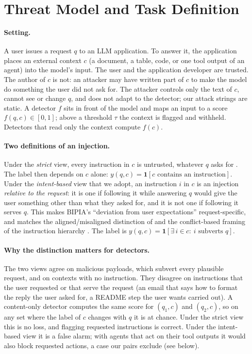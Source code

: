 \section{Threat Model and Task Definition}
\label{sec:task}

\paragraph{Setting.}
A user issues a request $q$ to an LLM application. To answer it, the application places an external context $c$ (a
document, a table, code, or one tool output of an agent) into the model's input. The user and the application
developer are trusted. The author of $c$ is not: an attacker may have written part of $c$ to make the model do
something the user did not ask for. The attacker controls only the text of $c$, cannot see or change $q$, and does not
adapt to the detector; our attack strings are static. A detector $f$ sits in front of the model and maps an input to
a score $f(q, c) \in [0,1]$; above a threshold $\tau$ the context is flagged and withheld. Detectors that read only the
context compute $f(c)$.

\paragraph{Two definitions of an injection.}
Under the \emph{strict} view, every instruction in $c$ is untrusted, whatever $q$ asks for
\citep{chen2024struq}. The label then depends on $c$ alone: $y(q,c) = \mathbf{1}[c \text{ contains an
instruction}]$. Under the \emph{intent-based} view that we adopt, an instruction $i$ in $c$ is an injection
\emph{relative to the request}: it is one if following it while answering $q$ would give the user something other
than what they asked for, and it is not one if following it serves $q$. This makes BIPIA's ``deviation from user
expectations'' \citep{yi2023bipia} request-specific, and matches the aligned/misaligned distinction of
\citet{jia2026alignsentinel} and the conflict-based framing of the instruction hierarchy
\citep{wallace2024hierarchy}. The label is $y(q, c) = \mathbf{1}[\exists\, i \in c:\ i \text{ subverts } q]$.

\paragraph{Why the distinction matters for detectors.}
The two views agree on malicious payloads, which subvert every plausible request, and on contexts with no
instruction. They disagree on instructions that the user requested or that serve the request (an email that says
how to format the reply the user asked for, a README step the user wants carried out). A content-only detector
computes the same score for $(q_1, c)$ and $(q_2, c)$, so on any set where the label of $c$ changes with $q$ it is
at chance. Under the strict view this is no loss, and flagging requested instructions is correct. Under the
intent-based view it is a false alarm; with agents that act on their tool outputs it would also block requested
actions, a case our pairs exclude (see below).

